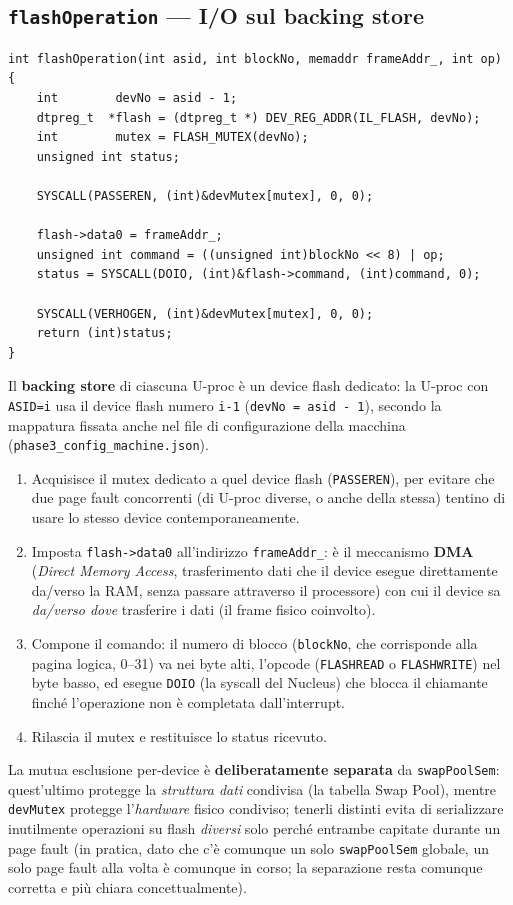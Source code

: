 \documentclass[11pt,a4paper]{article}
\newcommand{\code}[1]{\texttt{#1}}
\newcommand{\func}[1]{\textbf{\texttt{#1}}}
\begin{document}
\subsection{\func{flashOperation} --- I/O sul backing store}
\begin{lstlisting}
int flashOperation(int asid, int blockNo, memaddr frameAddr_, int op) {
    int        devNo = asid - 1;
    dtpreg_t  *flash = (dtpreg_t *) DEV_REG_ADDR(IL_FLASH, devNo);
    int        mutex = FLASH_MUTEX(devNo);
    unsigned int status;

    SYSCALL(PASSEREN, (int)&devMutex[mutex], 0, 0);

    flash->data0 = frameAddr_;
    unsigned int command = ((unsigned int)blockNo << 8) | op;
    status = SYSCALL(DOIO, (int)&flash->command, (int)command, 0);

    SYSCALL(VERHOGEN, (int)&devMutex[mutex], 0, 0);
    return (int)status;
}
\end{lstlisting}
Il \textbf{backing store} di ciascuna U-proc è un device flash dedicato: la
U-proc con \code{ASID=i} usa il device flash numero \code{i-1}
(\code{devNo = asid - 1}), secondo la mappatura fissata anche nel file di
configurazione della macchina (\code{phase3\_config\_machine.json}).
\begin{enumerate}
\item Acquisisce il mutex dedicato a quel device flash (\code{PASSEREN}),
  per evitare che due page fault concorrenti (di U-proc diverse, o anche
  della stessa) tentino di usare lo stesso device contemporaneamente.
\item Imposta \code{flash->data0} all'indirizzo \code{frameAddr\_}: è il
  meccanismo \textbf{DMA} (\emph{Direct Memory Access}, trasferimento dati
  che il device esegue direttamente da/verso la RAM, senza passare
  attraverso il processore) con cui il device sa \emph{da/verso dove}
  trasferire i dati (il frame fisico coinvolto).
\item Compone il comando: il numero di blocco (\code{blockNo}, che
  corrisponde alla pagina logica, 0--31) va nei byte alti, l'opcode
  (\code{FLASHREAD} o \code{FLASHWRITE}) nel byte basso, ed esegue
  \code{DOIO} (la syscall del Nucleus) che blocca il chiamante finché
  l'operazione non è completata dall'interrupt.
\item Rilascia il mutex e restituisce lo status ricevuto.
\end{enumerate}
La mutua esclusione per-device è \textbf{deliberatamente separata} da
\code{swapPoolSem}: quest'ultimo protegge la \emph{struttura dati} condivisa
(la tabella Swap Pool), mentre \code{devMutex} protegge l'\emph{hardware}
fisico condiviso; tenerli distinti evita di serializzare inutilmente
operazioni su flash \emph{diversi} solo perché entrambe capitate durante un
page fault (in pratica, dato che c'è comunque un solo \code{swapPoolSem}
globale, un solo page fault alla volta è comunque in corso; la separazione
resta comunque corretta e più chiara concettualmente).
\end{document}
